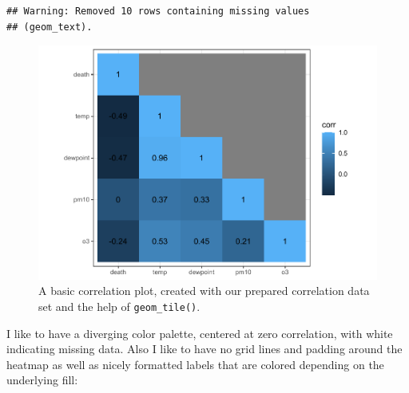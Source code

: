\documentclass[
]{krantz}
\begin{document}
\begin{verbatim}
## Warning: Removed 10 rows containing missing values
## (geom_text).
\end{verbatim}

\begin{figure}
\centering
\includegraphics{bookdown_files/figure-latex/tile-corr-plot-1.pdf}
\caption{\label{fig:tile-corr-plot}A basic correlation plot, created with our prepared correlation data set and the help of \texttt{geom\_tile()}.}
\end{figure}

I like to have a diverging color palette, centered at zero correlation, with white indicating missing data. Also I like to have no grid lines and padding around the heatmap as well as nicely formatted labels that are colored depending on the underlying fill:
\end{document}

